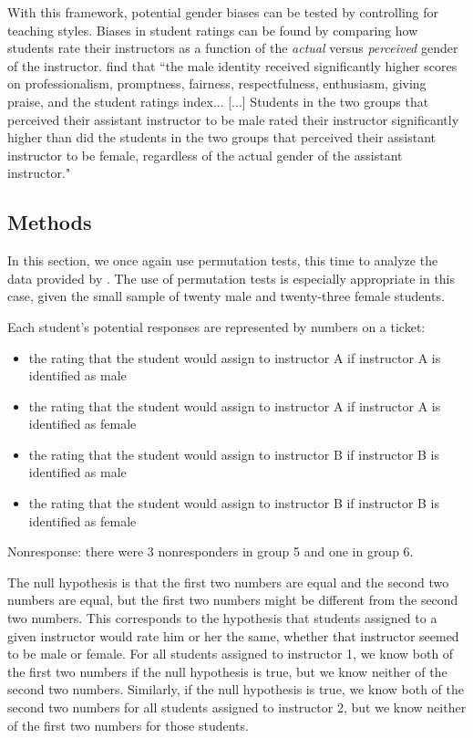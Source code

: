 \documentclass[12pt]{article}
\begin{document}
With this framework, potential gender biases can be tested by controlling for teaching styles. Biases in student ratings can be found by comparing how students rate their instructors as a function of the \textit{actual} versus \textit{perceived} gender of the instructor. \citet{MacNell2014} find that ``the male identity received significantly higher scores on professionalism, promptness, fairness, respectfulness, enthusiasm, giving praise, and the
student ratings index... [...] Students in the two groups that perceived their assistant
instructor to be male rated their instructor significantly higher than did the students in the
two groups that perceived their assistant instructor to be female, regardless of the actual gender
of the assistant instructor." 


\subsection{Methods}\label{macnell:methods}
In this section, we once again use permutation tests, this time to analyze the data provided by \citet{MacNell2014}. The use of permutation tests is especially appropriate in this case, given the small sample of twenty male and twenty-three female students.

Each student's potential responses are represented by numbers on a ticket:
\begin{itemize}
\item the rating that the student would assign to instructor A if instructor A is identified as male
\item the rating that the student would assign to instructor A if instructor A is identified as female
\item the rating that the student would assign to instructor B if instructor B is identified as male
\item the rating that the student would assign to instructor B if instructor B is identified as female
\end{itemize}

Nonresponse: there were 3 nonresponders in group 5 and one in group 6.


The null hypothesis is that the first two numbers are equal and the second two numbers are equal, but the first two numbers might be different from the second two numbers. This corresponds to the hypothesis that students assigned to a given instructor would rate him or her the same, whether that instructor seemed to be male or female. For all students assigned to instructor 1, we know both of the first two numbers if the null hypothesis is true, but we know neither of the second two numbers. Similarly, if the null hypothesis is true, we know both of the second two numbers for all students assigned to instructor 2, but we know neither of the first two numbers for those students. \\
\end{document}
